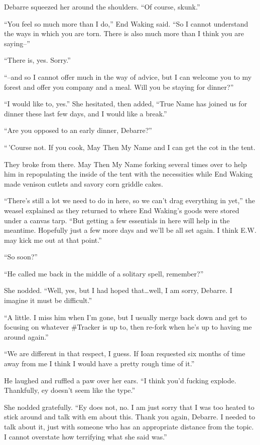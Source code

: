 Debarre squeezed her around the shoulders. ``Of course, skunk.''

``You feel so much more than I do,'' End Waking said. ``So I cannot understand the ways in which you are torn. There is also much more than I think you are saying--''

``There is, yes. Sorry.''

``--and so I cannot offer much in the way of advice, but I can welcome you to my forest and offer you company and a meal. Will you be staying for dinner?''

``I would like to, yes.'' She hesitated, then added, ``True Name has joined us for dinner these last few days, and I would like a break.''

``Are you opposed to an early dinner, Debarre?''

``\,'Course not. If you cook, May Then My Name and I can get the cot in the tent.

They broke from there. May Then My Name forking several times over to help him in repopulating the inside of the tent with the necessities while End Waking made venison cutlets and savory corn griddle cakes.

``There's still a lot we need to do in here, so we can't drag everything in yet,'' the weasel explained as they returned to where End Waking's goods were stored under a canvas tarp. ``But getting a few essentials in here will help in the meantime. Hopefully just a few more days and we'll be all set again. I think E.W. may kick me out at that point.''

``So soon?''

``He called me back in the middle of a solitary spell, remember?''

She nodded. ``Well, yes, but I had hoped that\ldots well, I am sorry, Debarre. I imagine it must be difficult.''

``A little. I miss him when I'm gone, but I usually merge back down and get to focusing on whatever \#Tracker is up to, then re-fork when he's up to having me around again.''

``We are different in that respect, I guess. If Ioan requested six months of time away from me I think I would have a pretty rough time of it.''

He laughed and ruffled a paw over her ears. ``I think you'd fucking explode. Thankfully, ey doesn't seem like the type.''

She nodded gratefully. ``Ey does not, no. I am just sorry that I was too heated to stick around and talk with em about this. Thank you again, Debarre. I needed to talk about it, just with someone who has an appropriate distance from the topic. I cannot overstate how terrifying what she said was.''

